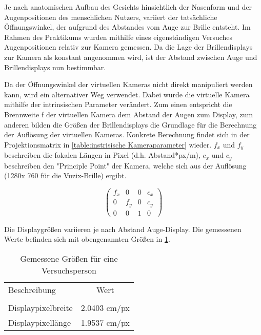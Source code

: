 Je nach anatomischen Aufbau des Gesichts hinsichtlich  der Nasenform und der Augenpositionen des menschlichen Nutzers, variiert der tatsächliche Öffnungswinkel, der aufgrund des Abstandes vom Auge zur Brille entsteht. Im Rahmen des Praktikums wurden mithilfe eines eigenständigen Versuches Augenpositionen relativ zur Kamera gemessen. Da die Lage der Brillendisplays zur Kamera als konstant angenommen wird, ist der Abstand zwischen Auge und Brillendisplays nun bestimmbar.

Da der Öffnungswinkel der virtuellen Kameras nicht direkt manipuliert werden kann, wird ein alternativer Weg verwendet. Dabei wurde die virtuelle Kamera mithilfe der intrinsischen Parameter verändert. Zum einen entspricht die Brennweite f der virtuellen Kamera dem Abstand der Augen zum Display, zum anderen bilden die Größen der Brillendisplays die Grundlage für die Berechnung der Auflösung der virtuellen Kameras. Konkrete Berechnung findet sich in der Projektionsmatrix in \ref{table:instrisische Kameraparameter} wieder. $f_x$ und $f_y$ beschreiben die fokalen Längen in Pixel (d.h. Abstand*px/m), $c_x$ und $c_y$ beschreiben den "Principle Point" der Kamera, welche sich aus der Auflösung (1280x 760 für die Vuzix-Brille) ergibt. 

%

\begin{equation}
\begin{pmatrix}
f_x & 0& 0& c_x \\
0 & f_y & 0 & c_y\\ 
0 & 0&   1 & 0  
\end{pmatrix}
\label{table:instrisische Kameraparameter}
\end{equation}

Die Displaygrößen variieren je nach Abstand Auge-Display. Die gemessenen Werte befinden sich mit obengenannten Größen in \ref{table:Messwerte DisplayAuge}.
%
 \begin{table}[ht]

 \begin{tabular}{lc} 
  Beschreibung & Wert \\ \\
  Displaypixelbreite & 2.0403 cm/px \\
  Displaypixellänge &  1.9537 cm/px \\
 \end{tabular}
 \caption{Gemessene Größen für eine Versuchsperson}
 \label{table:Messwerte DisplayAuge}
 \end{table}



